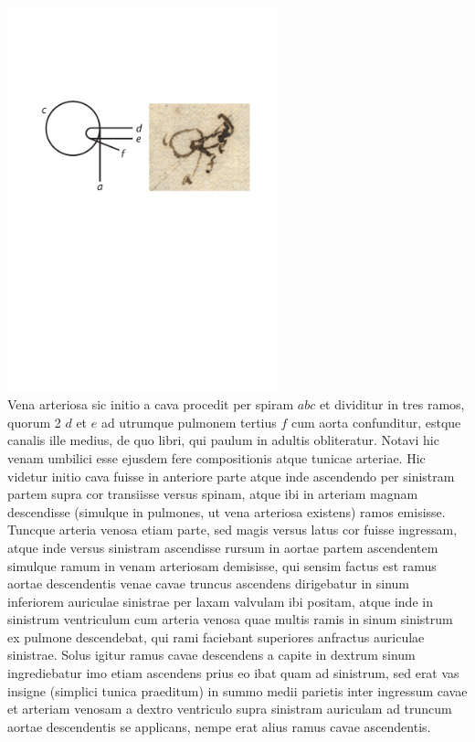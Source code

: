 \pstart%
\centering \includegraphics[trim = 0mm -3mm 0mm 0mm, clip,width=0.59\textwidth]{images/lh004014b_003v2.pdf}\\
\pend
{}
%
\footnotesize%
Vena arteriosa sic initio a cava procedit per spiram $abc$ et dividitur in tres ramos, quorum 2 $d$ et $e$ ad utrumque pulmonem tertius $f$ cum aorta confunditur, estque canalis ille medius, de quo libri, qui paulum in adultis obliteratur.
\pend
\vspace{0.5em}
\pstart
Notavi hic venam umbilici esse ejusdem fere compositionis atque tunicae arteriae. Hic videtur initio cava fuisse in anteriore parte atque inde ascendendo per sinistram partem supra cor transiisse versus spinam, atque ibi in arteriam magnam descendisse (simulque in pulmones, ut vena arteriosa existens) ramos emisisse. Tuncque arteria venosa etiam  parte, sed magis versus latus  cor fuisse ingressam, atque inde versus sinistram ascendisse rursum in aortae partem ascendentem simulque ramum\label{ramus} in venam arteriosam demisisse, qui sensim factus est ramus aortae descendentis venae cavae truncus ascendens dirigebatur in sinum inferiorem auriculae sinistrae per laxam valvulam ibi positam, atque inde in sinistrum ventriculum cum arteria venosa quae multis ramis in sinum sinistrum ex pulmone descendebat, qui rami faciebant superiores anfractus auriculae sinistrae. Solus igitur ramus cavae descendens a capite in dextrum sinum ingrediebatur imo etiam ascendens prius eo ibat quam ad sinistrum, sed erat vas insigne (simplici tunica praeditum) in summo medii parietis inter ingressum cavae et arteriam venosam a dextro ventriculo supra sinistram auriculam ad truncum aortae descendentis se applicans, nempe erat alius ramus cavae ascendentis. 
